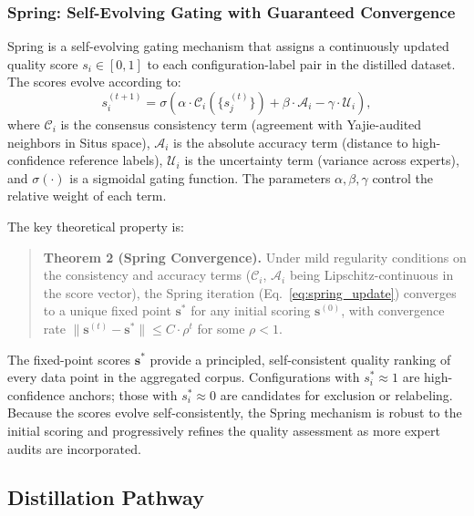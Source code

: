 \documentclass[twoside,prb,aps,floatfix,superscriptaddress,longbibliography]{revtex4-2}
\begin{document}
\subsubsection{Spring: Self-Evolving Gating with Guaranteed Convergence}

Spring is a self-evolving gating mechanism that assigns a continuously updated quality score $s_i \in [0, 1]$ to each configuration-label pair in the distilled dataset. The scores evolve according to:
\begin{equation}
s_i^{(t+1)} = \sigma\!\left( \alpha \cdot \mathcal{C}_i(\{s_j^{(t)}\}) + \beta \cdot \mathcal{A}_i - \gamma \cdot \mathcal{U}_i \right),
\label{eq:spring_update}
\end{equation}
where $\mathcal{C}_i$ is the consensus consistency term (agreement with Yajie-audited neighbors in Situs space), $\mathcal{A}_i$ is the absolute accuracy term (distance to high-confidence reference labels), $\mathcal{U}_i$ is the uncertainty term (variance across experts), and $\sigma(\cdot)$ is a sigmoidal gating function. The parameters $\alpha, \beta, \gamma$ control the relative weight of each term.

The key theoretical property is:

\begin{quote}
\textbf{Theorem 2 (Spring Convergence).} Under mild regularity conditions on the consistency and accuracy terms ($\mathcal{C}_i$, $\mathcal{A}_i$ being Lipschitz-continuous in the score vector), the Spring iteration (Eq.~\ref{eq:spring_update}) converges to a unique fixed point $\mathbf{s}^*$ for any initial scoring $\mathbf{s}^{(0)}$, with convergence rate $\| \mathbf{s}^{(t)} - \mathbf{s}^* \| \le C \cdot \rho^t$ for some $\rho < 1$.
\end{quote}

The fixed-point scores $\mathbf{s}^*$ provide a principled, self-consistent quality ranking of every data point in the aggregated corpus. Configurations with $s_i^* \approx 1$ are high-confidence anchors; those with $s_i^* \approx 0$ are candidates for exclusion or relabeling. Because the scores evolve self-consistently, the Spring mechanism is robust to the initial scoring and progressively refines the quality assessment as more expert audits are incorporated.

\subsection{Distillation Pathway}
\end{document}
